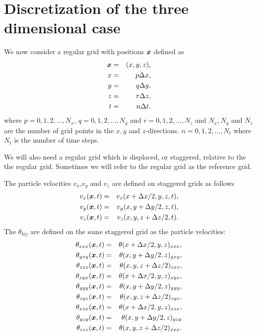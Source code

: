 \documentclass[11pt]{article}
\begin{document}
\section*{Discretization of the three dimensional case}
We now consider a regular grid with positions $\mbox{\boldmath $x$}$ defined as
\begin{eqnarray}
\mbox{\boldmath $x$} & = & (x,y,z),\\
x   & = & p\Delta x,\\
y   & = & q\Delta y,\\
z   & = & r\Delta z,\\
t   & = & n\Delta t.
\end{eqnarray}
where $p=0,1,2,\ldots,N_x$, $q=0,1,2,\ldots,N_y$ and $r=0,1,2,\ldots,N_z$ and
$N_x,N_y$ and $N_z$ are the number of grid points in the $x,y$ and $z$-directions.
$n=0,1,2,\ldots,N_t$ where $N_t$ is the number of time steps.

We will also need a regular grid which is displaced, or staggered, relative to the the regular grid.
Sometimes we will refer to the regular grid as the reference grid.

The particle velocities  $v_x$,$v_y$ and $v_z$ are defined on staggered grids
as follows
%
\begin{eqnarray}
   v_x(\mbox{\boldmath $x$}, t) & = & v_x(x+\Delta x/2, y, z, t),\\
   v_y(\mbox{\boldmath $x$}, t) & = & v_y(x, y+\Delta y/2, z, t),\\
   v_z(\mbox{\boldmath $x$}, t) & = & v_z(x, y, z+\Delta z/2, t). 
\end{eqnarray}
%
The $\theta_{kij}$ are defined on the same staggered grid as the
particle velocities:
\begin{eqnarray}
   \theta_{xxx}(\mbox{\boldmath $x$}, t) & = & \theta(x+\Delta x/2,y,z)_{xxx},\\
   \theta_{yxy}(\mbox{\boldmath $x$}, t) & = & \theta(x,y+\Delta y/2,z)_{yxy},\\
   \theta_{zxz}(\mbox{\boldmath $x$}, t) & = & \theta(x,y,z+\Delta z/2)_{zxz},\\
   \theta_{xyx}(\mbox{\boldmath $x$}, t) & = & \theta(x+\Delta x/2,y,z)_{xyx},\\
   \theta_{yyy}(\mbox{\boldmath $x$}, t) & = & \theta(x,y+\Delta y/2,z)_{yyy},\\
   \theta_{zyz}(\mbox{\boldmath $x$}, t) & = & \theta(x,y,z+\Delta z/2  )_{zyz},\\
   \theta_{xzx}(\mbox{\boldmath $x$}, t) & = & \theta(x+\Delta x/2,y,z)_{xzx},\\
   \theta_{yzy}(\mbox{\boldmath $x$}, t) & = & \theta(x,y+\Delta y/2,z)_{yzy}\\
   \theta_{zzz}(\mbox{\boldmath $x$}, t) & = & \theta(x,y,z+\Delta z/2)_{xxx}.
\end{eqnarray}
\end{document}
